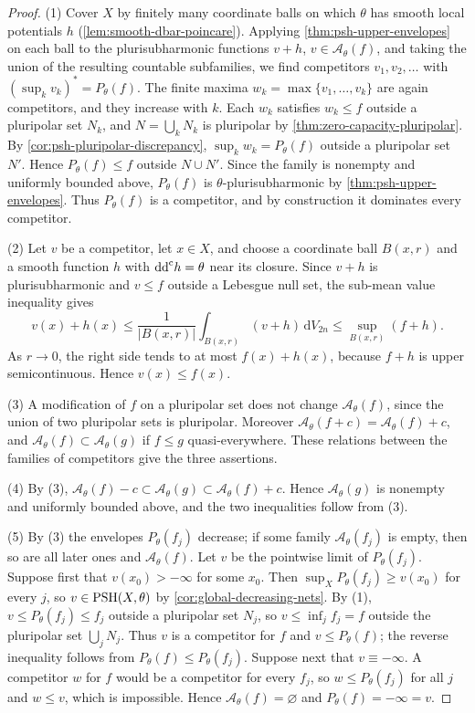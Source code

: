\begin{proof}
(1) Cover $X$ by finitely many coordinate balls on which $\theta$ has smooth local potentials $h$ (\cref{lem:smooth-dbar-poincare}). Applying \cref{thm:psh-upper-envelopes} on each ball to the plurisubharmonic functions $v+h$, $v\in\mathcal A_\theta(f)$, and taking the union of the resulting countable subfamilies, we find competitors $v_1,v_2,\ldots$ with $(\sup_kv_k)^*=P_\theta(f)$. The finite maxima $w_k=\max\{v_1,\ldots,v_k\}$ are again competitors, and they increase with $k$. Each $w_k$ satisfies $w_k\leq f$ outside a pluripolar set $N_k$, and $N=\bigcup_kN_k$ is pluripolar by \cref{thm:zero-capacity-pluripolar}. By \cref{cor:psh-pluripolar-discrepancy}, $\sup_kw_k=P_\theta(f)$ outside a pluripolar set $N'$. Hence $P_\theta(f)\leq f$ outside $N\cup N'$. Since the family is nonempty and uniformly bounded above, $P_\theta(f)$ is $\theta$-plurisubharmonic by \cref{thm:psh-upper-envelopes}. Thus $P_\theta(f)$ is a competitor, and by construction it dominates every competitor.

(2) Let $v$ be a competitor, let $x\in X$, and choose a coordinate ball $B(x,r)$ and a smooth function $h$ with $\mathrm{dd}^{\mathrm{c}} h=\theta$ near its closure. Since $v+h$ is plurisubharmonic and $v\leq f$ outside a Lebesgue null set, the sub-mean value inequality gives
\[
 v(x)+h(x)\leq\frac1{|B(x,r)|}\int_{B(x,r)}(v+h)\,\mathrm dV_{2n}
          \leq\sup_{B(x,r)}(f+h).
\]
As $r\to0$, the right side tends to at most $f(x)+h(x)$, because $f+h$ is upper semicontinuous. Hence $v(x)\leq f(x)$.

(3) A modification of $f$ on a pluripolar set does not change $\mathcal A_\theta(f)$, since the union of two pluripolar sets is pluripolar. Moreover $\mathcal A_\theta(f+c)=\mathcal A_\theta(f)+c$, and $\mathcal A_\theta(f)\subset\mathcal A_\theta(g)$ if $f\leq g$ quasi-everywhere. These relations between the families of competitors give the three assertions.

(4) By (3), $\mathcal A_\theta(f)-c\subset\mathcal A_\theta(g)\subset\mathcal A_\theta(f)+c$. Hence $\mathcal A_\theta(g)$ is nonempty and uniformly bounded above, and the two inequalities follow from (3).

(5) By (3) the envelopes $P_\theta(f_j)$ decrease; if some family $\mathcal A_\theta(f_j)$ is empty, then so are all later ones and $\mathcal A_\theta(f)$. Let $v$ be the pointwise limit of $P_\theta(f_j)$. Suppose first that $v(x_0)>-\infty$ for some $x_0$. Then $\sup_XP_\theta(f_j)\geq v(x_0)$ for every $j$, so $v\in\mathrm{PSH}(X,\theta)$ by \cref{cor:global-decreasing-nets}. By (1), $v\leq P_\theta(f_j)\leq f_j$ outside a pluripolar set $N_j$, so $v\leq\inf_jf_j=f$ outside the pluripolar set $\bigcup_jN_j$. Thus $v$ is a competitor for $f$ and $v\leq P_\theta(f)$; the reverse inequality follows from $P_\theta(f)\leq P_\theta(f_j)$. Suppose next that $v\equiv-\infty$. A competitor $w$ for $f$ would be a competitor for every $f_j$, so $w\leq P_\theta(f_j)$ for all $j$ and $w\leq v$, which is impossible. Hence $\mathcal A_\theta(f)=\varnothing$ and $P_\theta(f)=-\infty=v$.
\end{proof}

